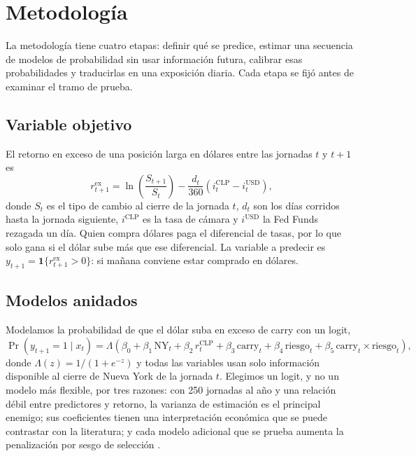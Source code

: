 \documentclass[11pt,a4paper]{article}
\newcommand{\rex}{r^{\text{ex}}}
\begin{document}
\section{Metodología}\label{sec:metodologia}

La metodología tiene cuatro etapas: definir qué se predice, estimar una secuencia de modelos de probabilidad sin usar información futura, calibrar esas probabilidades y traducirlas en una exposición diaria. Cada etapa se fijó antes de examinar el tramo de prueba.

\subsection{Variable objetivo}
El retorno en exceso de una posición larga en dólares entre las jornadas \(t\) y \(t+1\) es
\begin{equation}\label{eq:rex}
\rex_{t+1} = \ln\!\left(\frac{S_{t+1}}{S_t}\right) - \frac{d_t}{360}\left(i^{\text{CLP}}_t - i^{\text{USD}}_t\right),
\end{equation}
donde \(S_t\) es el tipo de cambio al cierre de la jornada \(t\), \(d_t\) son los días corridos hasta la jornada siguiente, \(i^{\text{CLP}}\) es la tasa de cámara y \(i^{\text{USD}}\) la Fed Funds rezagada un día. Quien compra dólares paga el diferencial de tasas, por lo que solo gana si el dólar sube más que ese diferencial. La variable a predecir es \(y_{t+1}=\mathbf{1}\{\rex_{t+1}>0\}\): si mañana conviene estar comprado en dólares.

\subsection{Modelos anidados}
Modelamos la probabilidad de que el dólar suba en exceso de carry con un logit,
\begin{equation}\label{eq:logit}
\Pr(y_{t+1}=1\mid x_t) = \Lambda\!\left(\beta_0 + \beta_1\,\text{NY}_t + \beta_2\,r^{\text{CLP}}_t + \beta_3\,\text{carry}_t + \beta_4\,\text{riesgo}_t + \beta_5\,\text{carry}_t\times\text{riesgo}_t\right),
\end{equation}
donde \(\Lambda(z)=1/(1+e^{-z})\) y todas las variables usan solo información disponible al cierre de Nueva York de la jornada \(t\). Elegimos un logit, y no un modelo más flexible, por tres razones: con 250 jornadas al año y una relación débil entre predictores y retorno, la varianza de estimación es el principal enemigo; sus coeficientes tienen una interpretación económica que se puede contrastar con la literatura; y cada modelo adicional que se prueba aumenta la penalización por sesgo de selección \citep{bailey2014}.
\end{document}
